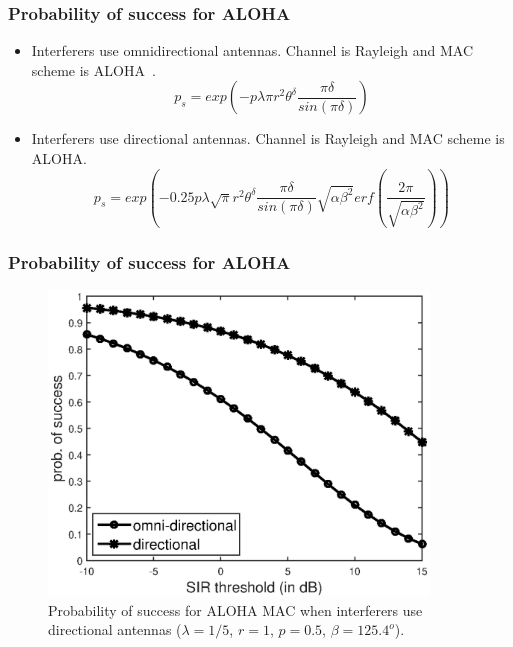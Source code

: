\documentclass{beamer}
\begin{document}
\begin{frame}
\frametitle{\color{WPI_red} Probability of success for ALOHA}
\begin{itemize}

\item Interferers use omnidirectional antennas. Channel is Rayleigh and MAC scheme is ALOHA~\cite{haenggi2009}.
\begin{equation*}
p_s = exp\left(-p\lambda\pi r^2\theta^\delta\frac{\pi \delta}{sin(\pi\delta)}\right)
\end{equation*}

\item Interferers use directional antennas. Channel is Rayleigh and MAC scheme is ALOHA.
\begin{equation*}
p_s = exp\left(-0.25p\lambda\sqrt{\pi} r^2\theta^\delta\frac{\pi \delta}{sin(\pi\delta)}\sqrt{\alpha\beta^2} erf\left(\frac{2\pi}{\sqrt{\alpha\beta^2}}\right)\right)
\end{equation*}



\end{itemize}

\end{frame}

\begin{frame}
\frametitle{\color{WPI_red} Probability of success for ALOHA}

\begin{figure}
    \centering
    \includegraphics[resolution=2400, width=0.9\textwidth]{aloha.eps}
    \caption{Probability of success for ALOHA MAC when interferers use directional antennas ($\lambda=1/5$, $r=1$, $p=0.5$, $\beta=125.4^o$).}
\end{figure}



\end{frame}
\end{document}
